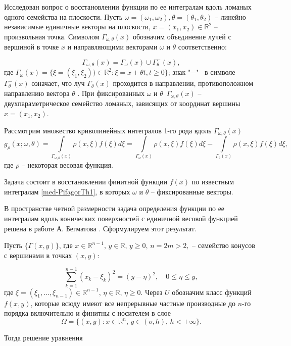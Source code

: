 Исследован вопрос о восстановлении функции по ее интегралам вдоль ломаных одного семейства на плоскости.
Пусть $\omega=(\omega_1,\omega_2), \theta=(\theta_1, \theta_2)$ -- линейно независимые единичные векторы на плоскости, $x=(x_1, x_2)\in\mathbb R^2$ -- произвольная точка. Символом $\Gamma_{\omega, \theta}(x)$ обозначим объединение лучей с вершиной в точке $x$ и направляющими векторами $\omega$ и $\theta$ соответственно:

$$\Gamma_{\omega, \theta}(x)=\Gamma_{\omega}(x)\cup \Gamma_{\theta}^-(x),$$
где $\Gamma_{\omega}(x)=\{\xi=(\xi_1,\xi_2))\in\mathbb R^2:\xi=x+\theta t, t\geq 0\}$; знак "$-$" $\,$  в символе $\Gamma_{\theta}^-(x)$ означает, что луч  $\Gamma_{\theta}(x)$ проходится в направлении, противоположном направлению вектора $\theta$ . При фиксированных $\omega$ и $\theta$ $\,\Gamma_{\omega, \theta}(x)$ -- двухпараметрическое семейство ломаных, зависящих от координат вершины $x=(x_1,x_2)$.

Рассмотрим множество криволинейных интегралов 1-го рода вдоль $\Gamma_{\omega, \theta}(x)$
\begin{equation}
\label{med-PifagorTh1}
g_\rho(x;\omega,\theta)=\int\limits_{\Gamma_{\omega, \theta}(x)} \rho(x,\xi)f(\xi)d\xi=\int\limits_{\Gamma_{\omega}(x)} \rho(x,\xi)f(\xi)d\xi-\int\limits_{\Gamma_{\theta}(x)} \rho(x,\xi)f(\xi)d\xi,
\end{equation}
где $\rho$ -- некоторая весовая функция.


Задача состоит в восстановлении финитной функции $f(x)$ по известным интегралам \eqref{med-PifagorTh1}, в которых $\omega$ и $\theta$ -- фиксированные векторы.

В пространстве четной размерности задача определения функции по ее интегралам вдоль конических поверхностей с единичной весовой функцией решена в работе А. Бегматова \cite{med-metka3}. Сформулируем этот результат.

Пусть $\{\Gamma(x,y)\}$, где $x\in \mathbb R^{n-1}, \, y\in\mathbb R, \, y\geq0,\, n=2m>2,$ -- семейство конусов с вершинами в точках $(x,y)$:

$$\sum\limits_{k=1}^{n-1}(x_k-\xi_k)^2=(y-\eta)^2, \quad 0\leq\eta\leq y,$$
где $\xi=(\xi_1,\ldots,\xi_{n-1})\in\mathbb R^{n-1},\, \eta\in\mathbb R, \, \eta\geq0$. Через $U$ обозначим класс функций $f(x,y)$, которые всюду имеют все непрерывные частные производные до $n$-го порядка включительно и финитны с носителем в слое
$$\Omega=\{(x,y): x\in \mathbb R^n,\, y\in (o,h), \, h<+\infty\}.$$

Тогда решение уравнения

